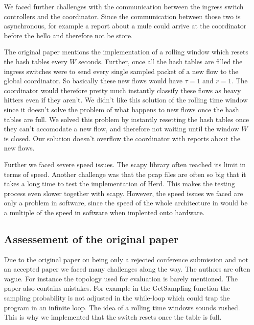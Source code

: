 \documentclass[11pt,oneside,a4paper]{article}
\begin{document}
We faced further challenges with the communication between the ingress switch controllers and the coordinator. Since the communication between those two is asynchronous, for example a report about a mule could arrive at the coordinator before the hello and therefore not be store.%

The original paper mentions the implementation of a rolling window which resets the hash tables every $W$ seconds. Further, once all the hash tables are filled the ingress switches were to send every single sampled packet of a new flow to the global coordinator. So basically these new flows would have $\tau = 1$ and $r = 1$. The coordinator would therefore pretty much instantly classify these flows as heavy hitters even if they aren't. We didn't like this solution of the rolling time window since it doesn't solve the problem of what happens to new flows once the hash tables are full. We solved this problem by instantly resetting the hash tables once they can't accomodate a new flow, and therefore not waiting until the window $W$ is closed. Our solution doesn't overflow the coordinator with reports about the new flows.

Further we faced severe speed issues. The scapy library often reached its limit in terms of speed. Another challenge was that the pcap files are often so big that it takes a long time to test the implementation of Herd. This makes the testing process even slower together with scapy. 
However, the speed issues we faced are only a problem in software, since the speed of the whole architecture in would be a multiple of the speed in software when implented onto hardware.

\subsection{Assessement of the original paper} \label{original_paper}
Due to the original paper on being only a rejected conference submission and not an accepted paper we faced many challenges along the way. The authors are often vague. For instance the topology used for evaluation is barely mentioned. The paper also contains mistakes. For example in the GetSampling function the sampling probability is not adjusted in the while-loop which could trap the program in an infinite loop. The idea of a rolling time windows sounds rushed. This is why we implemented that the switch resets once the table is full.
\end{document}
